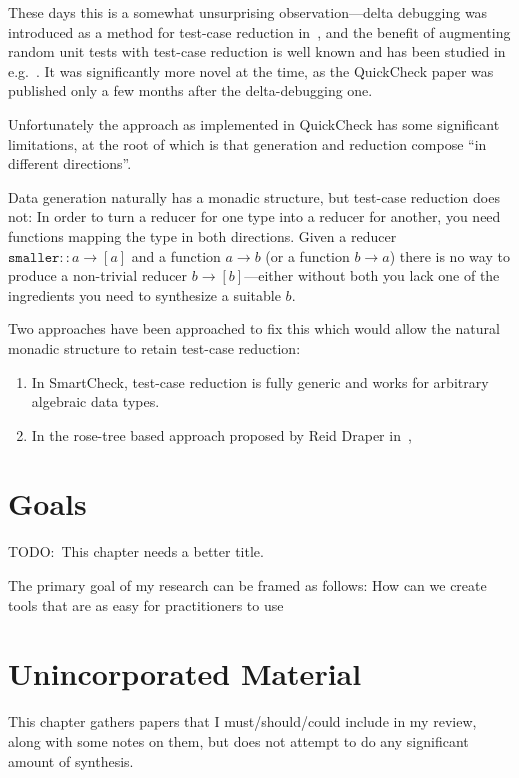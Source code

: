 These days this is a somewhat unsurprising observation---delta
debugging was introduced as a method for test-case reduction in~\cite{DBLP:journals/tse/ZellerH02},
and the benefit of augmenting random unit tests with test-case reduction is well known and has been studied in e.g.~\cite{DBLP:conf/issre/LeiA05,DBLP:conf/pldi/RegehrCCEEY12}.
It was significantly more novel at the time,
as the QuickCheck paper was published only a few months after the delta-debugging one.

Unfortunately the approach as implemented in QuickCheck has some significant limitations,
at the root of which is that generation and reduction compose ``in different directions''.

Data generation naturally has a monadic structure,
but test-case reduction does not:
In order to turn a reducer for one type into a reducer for another,
you need functions mapping the type in both directions.
Given a reducer \(\texttt{smaller} :: a \to [a]\) and a function \(a \to b\) (or a function \(b \to a\)) there is no way to produce a non-trivial reducer \(b \to [b]\)---either
without both you lack one of the ingredients you need to synthesize a suitable \(b\).

Two approaches have been approached to fix this which would allow the natural monadic structure to retain test-case reduction:

\begin{enumerate}
\item In SmartCheck\cite{DBLP:conf/haskell/Pike14},
test-case reduction is fully generic and works for arbitrary algebraic data types.
\item In the rose-tree based approach proposed by Reid Draper in~\cite{FreeShrinking},
\end{enumerate}

\chapter{Goals}

TODO:\ This chapter needs a better title.

The primary goal of my research can be framed as follows:
How can we create tools that are as easy for practitioners to use 

\chapter{Unincorporated Material}

This chapter gathers papers that I must/should/could include in my review,
along with some notes on them,
but does not attempt to do any significant amount of synthesis.

